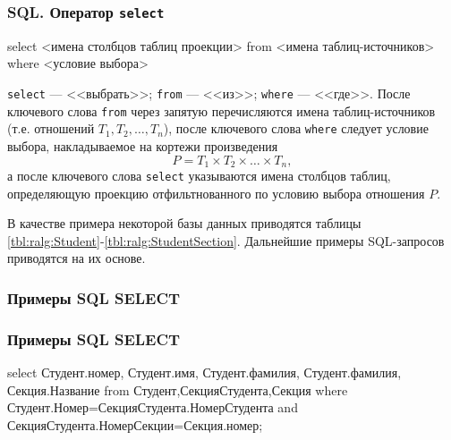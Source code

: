 \begin{frame}[fragile]
    \frametitle{SQL. Оператор \verb"select"}
    
\begin{semiverbatim}
\alert{select} <имена столбцов таблиц проекции>
\alert{from}   <имена таблиц-источников>
\alert{where}  <условие выбора>
\end{semiverbatim}

    \verb"select" --- <<выбрать>>; \verb"from" --- <<из>>; \verb"where" --- <<где>>. После ключевого слова \verb"from" через запятую перечисляются имена таблиц-источников (т.е. отношений $T_1,T_2,\ldots,T_n$), после ключевого слова \verb"where" следует условие \alert{выбора}, накладываемое на кортежи \alert{произведения} 
    \[P=T_1\times T_2\times\ldots\times T_n,\] 
    а после ключевого слова \verb"select" указываются имена столбцов таблиц, определяющую \alert{проекцию} отфильтнованного по условию выбора отношения $P$.
\end{frame}



В качестве примера некоторой базы данных приводятся таблицы \ref{tbl:ralg:Student}-\ref{tbl:ralg:StudentSection}. Дальнейшие примеры SQL-запросов приводятся на их основе.

\begin{frame}[fragile]
    \frametitle{Примеры SQL SELECT}
    
\begin{semiverbatim}


\end{semiverbatim}
\end{frame}

\begin{frame}[fragile]
    \frametitle{Примеры SQL SELECT}
    
\begin{semiverbatim}
\alert{select}
    Студент.номер, Студент.имя, Студент.фамилия, 
    Студент.фамилия, Секция.Название
\alert{from}
    Студент,СекцияСтудента,Секция
\alert{where}
    Студент.Номер=СекцияСтудента.НомерСтудента \alert{and}
    СекцияСтудента.НомерСекции=Секция.номер;
\end{semiverbatim}
\end{frame}

